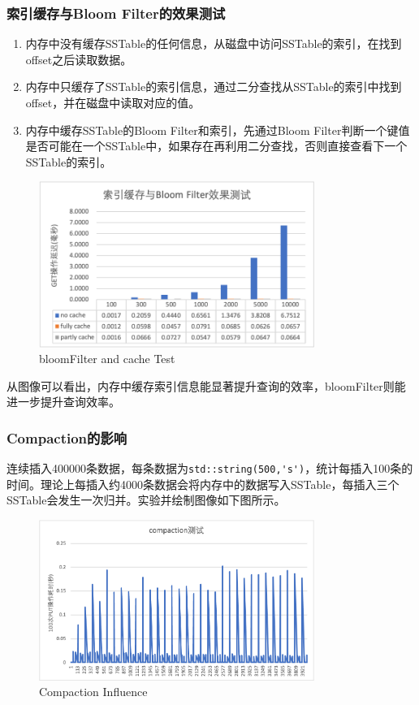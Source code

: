 \documentclass[fontset=windows]{article}
\begin{document}
\subsubsection{索引缓存与Bloom Filter的效果测试}
\begin{enumerate}
    \item 内存中没有缓存SSTable的任何信息，从磁盘中访问SSTable的索引，在找到offset之后读取数据。
    \item 内存中只缓存了SSTable的索引信息，通过二分查找从SSTable的索引中找到offset，并在磁盘中读取对应的值。
    \item 内存中缓存SSTable的Bloom Filter和索引，先通过Bloom Filter判断一个键值是否可能在一个SSTable中，如果存在再利用二分查找，否则直接查看下一个SSTable的索引。
\end{enumerate}
\begin{figure}[ht]
\centering
\includegraphics[width=0.8\textwidth]{img/bloomFilter_cache_test.png}
\caption{bloomFilter and cache Test}
\label{fig:b_c_test}
\end{figure}

从图像可以看出，内存中缓存索引信息能显著提升查询的效率，bloomFilter则能进一步提升查询效率。
\subsubsection{Compaction的影响}
连续插入400000条数据，每条数据为\verb|std::string(500,'s')|，统计每插入100条的时间。理论上每插入约4000条数据会将内存中的数据写入SSTable，每插入三个SSTable会发生一次归并。实验并绘制图像如下图所示。
\begin{figure}[ht]
\centering
\includegraphics[width=0.8\textwidth]{img/compaction_test.png}
\caption{Compaction Influence}
\label{fig:compaction_test}
\end{figure}
\end{document}
